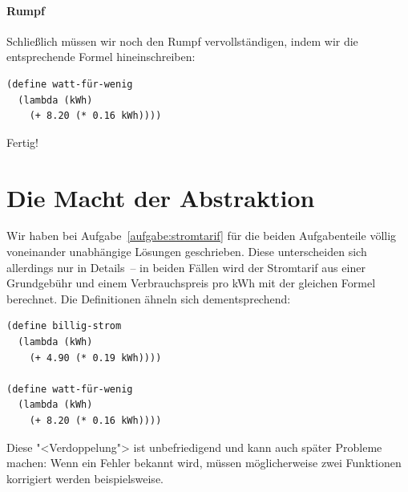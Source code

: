 \paragraph{Rumpf}

Schließlich müssen wir noch den Rumpf vervollständigen, indem wir die
entsprechende Formel hineinschreiben:
%
\begin{verbatim}
(define watt-für-wenig
  (lambda (kWh)
    (+ 8.20 (* 0.16 kWh))))
\end{verbatim}
%
Fertig!

\section{Die Macht der Abstraktion}

Wir haben bei Aufgabe~\ref{aufgabe:stromtarif} für die beiden
Aufgabenteile völlig voneinander unabhängige Lösungen geschrieben.
Diese unterscheiden sich allerdings nur in Details~-- in beiden Fällen
wird der Stromtarif aus einer Grundgebühr und einem Verbrauchspreis
pro kWh mit der gleichen Formel berechnet.  Die Definitionen ähneln
sich dementsprechend:
%
\begin{verbatim}
(define billig-strom
  (lambda (kWh)
    (+ 4.90 (* 0.19 kWh))))

(define watt-für-wenig
  (lambda (kWh)
    (+ 8.20 (* 0.16 kWh))))
\end{verbatim}
%
Diese "<Verdoppelung"> ist unbefriedigend und kann auch später
Probleme machen: Wenn ein Fehler bekannt wird, müssen möglicherweise
zwei Funktionen korrigiert werden beispielsweise.

